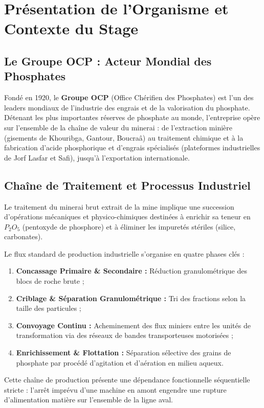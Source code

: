 ﻿\chapter{Présentation de l'Organisme et Contexte du Stage}

\section{Le Groupe OCP : Acteur Mondial des Phosphates}

Fondé en 1920, le \textbf{Groupe OCP} (Office Chérifien des Phosphates) est l'un des leaders mondiaux de l'industrie des engrais et de la valorisation du phosphate. Détenant les plus importantes réserves de phosphate au monde, l'entreprise opère sur l'ensemble de la chaîne de valeur du minerai : de l'extraction minière (gisements de Khouribga, Gantour, Boucraâ) au traitement chimique et à la fabrication d'acide phosphorique et d'engrais spécialisés (plateformes industrielles de Jorf Lasfar et Safi), jusqu'à l'exportation internationale.

\section{Chaîne de Traitement et Processus Industriel}

Le traitement du minerai brut extrait de la mine implique une succession d'opérations mécaniques et physico-chimiques destinées à enrichir sa teneur en $P_2O_5$ (pentoxyde de phosphore) et à éliminer les impuretés stériles (silice, carbonates). 

Le flux standard de production industrielle s'organise en quatre phases clés :
\begin{enumerate}
    \item \textbf{Concassage Primaire \& Secondaire :} Réduction granulométrique des blocs de roche brute ;
    \item \textbf{Criblage \& Séparation Granulométrique :} Tri des fractions selon la taille des particules ;
    \item \textbf{Convoyage Continu :} Acheminement des flux miniers entre les unités de transformation via des réseaux de bandes transporteuses motorisées ;
    \item \textbf{Enrichissement \& Flottation :} Séparation sélective des grains de phosphate par procédé d'agitation et d'aération en milieu aqueux.
\end{enumerate}

Cette chaîne de production présente une dépendance fonctionnelle séquentielle stricte : l'arrêt imprévu d'une machine en amont engendre une rupture d'alimentation matière sur l'ensemble de la ligne aval.


